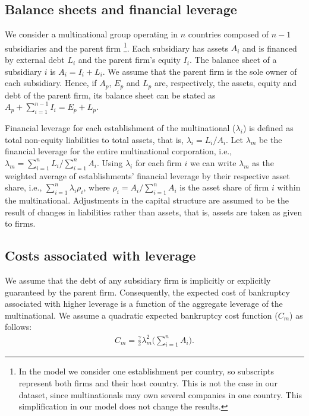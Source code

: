\documentclass[12pt]{article}
\begin{document}
\subsection{Balance sheets and financial leverage}
	\label{subsec:balancesheet}
	We consider a multinational group operating in $n$ countries composed of $n-1$ subsidiaries and the parent firm \footnote{In the model we consider one establishment per country, so subscripts represent both firms and their host country. This is not the case in our dataset, since multinationals may own several companies in one country. This simplification in our model does not change the results.}. Each subsidiary has assets $A_i$ and is financed by external debt $L_i$ and the parent firm's equity $I_i$. The balance sheet of a subsidiary $i$ is $A_i=I_i+L_i$. We assume that the parent firm is the sole owner of each subsidiary. Hence, if $A_p$, $E_p$ and $L_p$ are, respectively, the assets, equity and debt of the parent firm, its balance sheet can be stated as $A_p+\sum_{i=1}^{n-1}I_i=E_p+L_p$. 

	Financial leverage for each establishment of the multinational ($\lambda_i$) is defined as total non-equity liabilities to total assets, that is,  $\lambda_i=L_i/A_i$. Let $\lambda_m$ be the financial leverage for the entire multinational corporation, i.e., $\lambda_m=\sum_{i=1}^{n}L_i/\sum_{i=1}^{n}A_i$. Using $\lambda_i$ for each firm $i$ we can write $\lambda_m$ as the weighted average of establishments' financial leverage by their respective asset share, i.e., $\sum_{i=1}^{n}\lambda_i\rho_i$, where $\rho_i=A_i/\sum_{i=1}^{n}A_i$ is the asset share of firm $i$ within the multinational. Adjustments in the capital structure are assumed to be the result of changes in liabilities rather than assets, that is, assets are taken as given to firms. 
	
	\subsection{Costs associated with leverage}
	\label{subsec:costs}
	We assume that the debt of any subsidiary firm is implicitly or explicitly guaranteed by the parent firm. Consequently, the expected cost of bankruptcy associated with higher leverage is  a function of the aggregate leverage of the multinational. We assume a quadratic expected bankruptcy cost function ($C_m$) as follows:
	\begin{equation}
	\begin{aligned}
	C_m=\frac{\gamma}{2}\lambda_m^2\bigg(\sum_{i=1}^{n}A_i\bigg).
	\end{aligned}
	\label{eq:cost bankruptcy}
	\end{equation}
	
\end{document}
